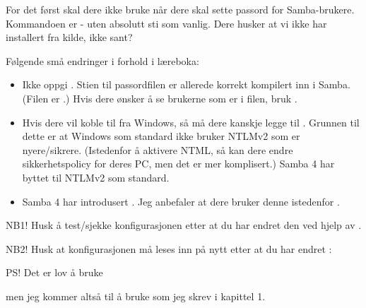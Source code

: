 For det først skal dere ikke bruke  når dere 
skal sette passord for Samba-brukere. Kommandoen er  - uten absolutt 
sti som vanlig. 
Dere husker at vi ikke har installert fra kilde, ikke sant? 

Følgende små endringer i forhold i læreboka:

\begin{itemize}
    \item Ikke oppgi . Stien til passordfilen er allerede 
        korrekt kompilert inn i Samba. (Filen er .)
        Hvis dere ønsker å se brukerne som er i filen, bruk .
    \item Hvis dere vil koble til fra Windows, så må dere kanskje legge til
        . Grunnen til dette er at Windows som standard ikke
        bruker NTLMv2 som er nyere/sikrere. (Istedenfor å aktivere NTML, så kan dere
        endre sikkerhetspolicy for deres PC, men det er mer komplisert.)
        Samba 4 har byttet til NTLMv2 som standard.
    \item Samba 4 har introdusert . Jeg anbefaler at dere bruker denne
        istedenfor .
\end{itemize}

NB1! Husk å test/sjekke konfigurasjonen etter at du har endret den ved hjelp av .

NB2! Husk at konfigurasjonen må leses inn på nytt etter at du har endret :


PS! Det er lov å bruke 


men jeg kommer altså til å bruke  som jeg skrev i kapittel 1.
